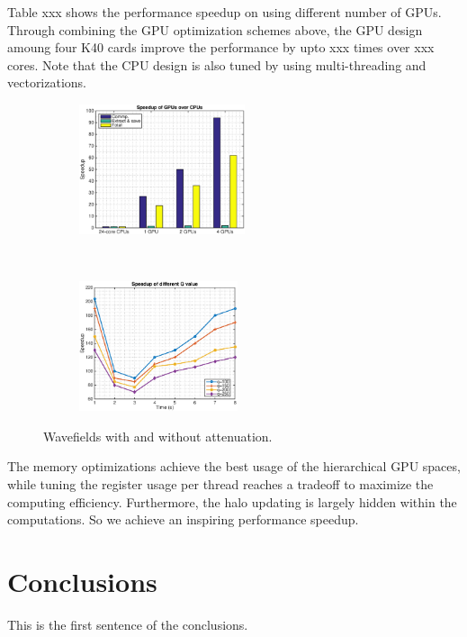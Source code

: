 \documentclass{paris17}
\begin{document}
Table xxx shows the performance speedup on using different number of GPUs. Through combining the GPU optimization schemes above, the GPU design amoung four K40 cards improve the performance by upto xxx times over xxx cores. Note that the CPU design is also tuned by using multi-threading and vectorizations.
\begin{figure}[h]
    \centering
    \begin{subfigure}[b]{0.4\textwidth}
        \centering
        \includegraphics[height=1.5in]{./fig/speedup.eps}
    \end{subfigure}%
    ~ 
    \begin{subfigure}[b]{0.4\textwidth}
        \centering
        \includegraphics[height=1.5in]{./fig/speedup_q.eps}
    \end{subfigure}
    \caption{Wavefields with and without attenuation.}
\end{figure}


The memory optimizations achieve the best usage of the hierarchical GPU spaces, while tuning the register usage per thread reaches a tradeoff to maximize the computing efficiency. Furthermore, the halo updating is largely hidden within the computations. So we achieve an inspiring performance speedup.

\section{Conclusions}

This is the first sentence of the conclusions.



\end{document}
